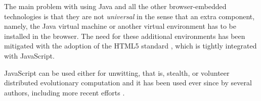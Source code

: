 \documentclass{sig-alternate}
\begin{document}
The main problem with using Java and all the other browser-embedded
technologies is that they are not {\em universal} in the
sense that an extra component, namely, the Java virtual machine or another
virtual environment has to be installed in the browser.
The need for
these additional environments has been mitigated with the
adoption of the HTML5 standard \cite{anthes2012html5}, which is
tightly integrated with JavaScript.

JavaScript can be used either for unwitting, that is, stealth,
\cite{unwitting-ec} or volunteer 
\cite{langdon:2005:metas,gecco07:workshop:dcor} distributed
evolutionary computation and it has been used ever since by several
authors, including more recent efforts
\cite{duda2013distributed,DBLP:journals/corr/abs-0801-1210}. 


\end{document}
